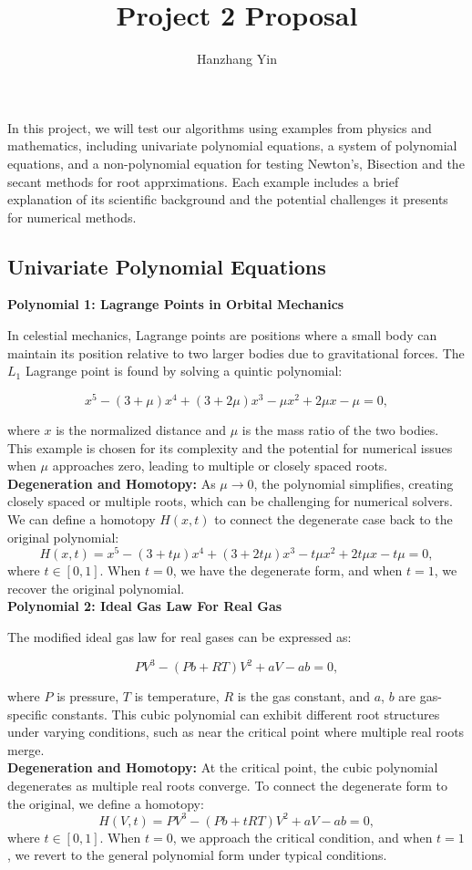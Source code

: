 \documentclass[12pt]{article}
\title{\vspace{-2cm}Project 2 Proposal}
\author{Hanzhang Yin}
\begin{document}
\maketitle

\noindent In this project, we will test our algorithms using examples from physics and mathematics, including univariate polynomial equations, a system of polynomial equations, and a non-polynomial equation for testing Newton's, Bisection and the secant methods for root apprximations. Each example includes a brief explanation of its scientific background and the potential challenges it presents for numerical methods.

\subsection*{Univariate Polynomial Equations}

\textbf{Polynomial 1: Lagrange Points in Orbital Mechanics}

\noindent In celestial mechanics, Lagrange points are positions where a small body can maintain its position relative to two larger bodies due to gravitational forces. The \( L_1 \) Lagrange point is found by solving a quintic polynomial:

\[
    x^5 - (3 + \mu)x^4 + (3 + 2\mu)x^3 - \mu x^2 + 2\mu x - \mu = 0,
\]

\noindent where \( x \) is the normalized distance and \( \mu \) is the mass ratio of the two bodies. This example is chosen for its complexity and the potential for numerical issues when \( \mu \) approaches zero, leading to multiple or closely spaced roots.
\\
\textbf{Degeneration and Homotopy:}
As \( \mu \rightarrow 0 \), the polynomial simplifies, creating closely spaced or multiple roots, which can be challenging for numerical solvers. We can define a homotopy \( H(x, t) \) to connect the degenerate case back to the original polynomial:
\[
H(x, t) = x^5 - (3 + t\mu)x^4 + (3 + 2t\mu)x^3 - t\mu x^2 + 2t\mu x - t\mu = 0,
\]
where \( t \in [0,1] \). When \( t = 0 \), we have the degenerate form, and when \( t = 1 \), we recover the original polynomial.
\\
\textbf{Polynomial 2: Ideal Gas Law For Real Gas}

\noindent The modified ideal gas law for real gases can be expressed as:

\[
    P V^3 - (P b + R T)V^2 + a V - a b = 0,
\]

\noindent where \( P \) is pressure, \( T \) is temperature, \( R \) is the gas constant, and \( a \), \( b \) are gas-specific constants. This cubic polynomial can exhibit different root structures under varying conditions, such as near the critical point where multiple real roots merge.
\\
\textbf{Degeneration and Homotopy:}
At the critical point, the cubic polynomial degenerates as multiple real roots converge. To connect the degenerate form to the original, we define a homotopy:
\[
H(V, t) = P V^3 - (P b + tR T)V^2 + a V - a b = 0,
\]
where \( t \in [0,1] \). When \( t = 0 \), we approach the critical condition, and when \( t = 1 \), we revert to the general polynomial form under typical conditions.
\end{document}

